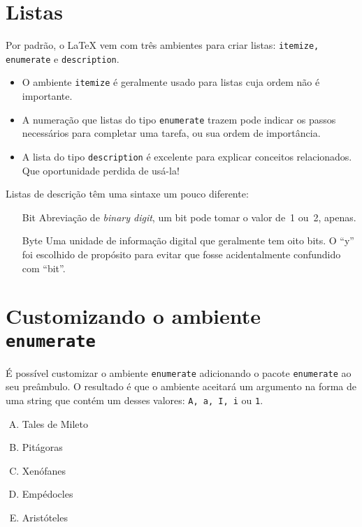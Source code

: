 \documentclass[a4paper,oneside]{article}
\begin{document}
\frenchspacing

\section{Listas}

Por padrão, o \LaTeX{} vem com três ambientes para criar listas:
\texttt{itemize, enumerate} e \texttt{description}.

\begin{itemize}
  \item O ambiente \texttt{itemize} é geralmente usado para listas cuja ordem
    não é importante.
  \item A numeração que listas do tipo \texttt{enumerate} trazem pode indicar
    os passos necessários para completar uma tarefa, ou sua ordem de
    importância.
  \item A lista do tipo \texttt{description} é excelente para explicar
    conceitos relacionados. Que oportunidade perdida de usá-la!
\end{itemize}

Listas de descrição têm uma sintaxe um pouco diferente:

\begin{enumerate}
  \item[Bit] Abreviação de \emph{binary digit}, um bit pode tomar o valor de~1
    ou~2, apenas.
  \item[Byte] Uma unidade de informação digital que geralmente tem oito bits. O
    “y” foi escolhido de propósito para evitar que fosse acidentalmente
    confundido com “bit”.
\end{enumerate}

\section{Customizando o ambiente \texttt{enumerate}}

É possível customizar o ambiente \texttt{enumerate} adicionando o pacote
\texttt{enumerate} ao seu preâmbulo. O resultado é que o ambiente aceitará um
argumento na forma de uma string que contém um desses valores: \texttt{A,
a, I, i} ou \texttt{1}.

\begin{enumerate}[A)]
  \item Tales de Mileto
  \item Pitágoras
  \item Xenófanes
  \item Empédocles
  \item Aristóteles
\end{enumerate}
\end{document}
